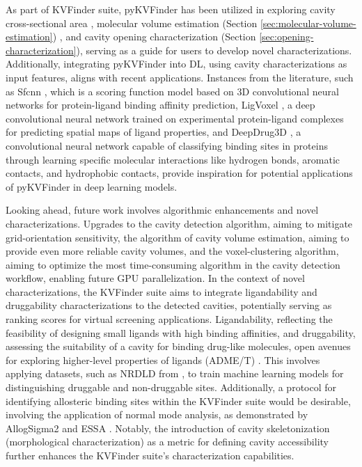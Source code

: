 \documentclass[Ingles]{phdthesis}
\begin{document}
As part of KVFinder suite, pyKVFinder has been utilized in exploring cavity cross-sectional area \cite{jefferson2023}, molecular volume estimation (Section \ref{sec:molecular-volume-estimation}) \cite{guerra2023A}, and cavity opening characterization (Section \ref{sec:opening-characterization}), serving as a guide for users to develop novel characterizations. Additionally, integrating pyKVFinder into \acs{DL}, using cavity characterizations as input features, aligns with recent applications.  Instances from the literature, such as Sfcnn \cite{wang2022}, which is a scoring function model based on 3D convolutional neural networks for protein-ligand binding affinity prediction, LigVoxel \cite{skalic2018}, a deep convolutional neural network trained on experimental protein-ligand complexes for predicting spatial maps of ligand properties, and DeepDrug3D \cite{pu2019}, a convolutional neural network capable of classifying binding sites in proteins through learning specific molecular interactions like hydrogen bonds, aromatic contacts, and hydrophobic contacts, provide inspiration for potential applications of pyKVFinder in deep learning models.

Looking ahead, future work involves algorithmic enhancements and novel characterizations. Upgrades to the cavity detection algorithm, aiming to mitigate grid-orientation sensitivity, the algorithm of cavity volume estimation, aiming to provide even more reliable cavity volumes, and the voxel-clustering algorithm, aiming to optimize the most time-consuming algorithm in the cavity detection workflow, enabling future GPU parallelization. In the context of novel characterizations, the KVFinder suite aims to integrate ligandability and druggability characterizations to the detected cavities, potentially serving as ranking scores for virtual screening applications. Ligandability, reflecting the feasibility of designing small ligands with high binding affinities, and druggability, assessing the suitability of a cavity for binding drug-like molecules, open avenues for exploring higher-level properties of ligands (ADME/T) \cite{xu2018}. This involves applying datasets, such as NRDLD from \cite{coleman2006}, to train machine learning models for distinguishing druggable and non-druggable sites. Additionally, a protocol for identifying allosteric binding sites within the KVFinder suite would be desirable, involving the application of normal mode analysis, as demonstrated by AllogSigma2 \cite{tan2020} and ESSA \cite{kaynak2020}. Notably, the introduction of cavity skeletonization (morphological characterization) as a metric for defining cavity accessibility  further enhances the KVFinder suite's characterization capabilities.
\end{document}
